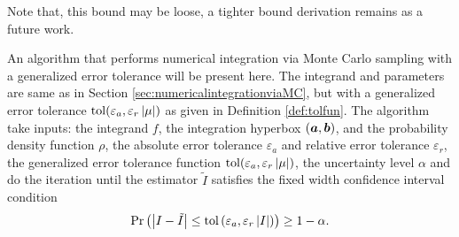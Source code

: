 \documentclass{iitthesis}
\theoremstyle{definition}
\begin{document}
Note that, this bound may be loose, a tighter bound derivation remains as a future work.


\label{sec:cubmcgalg}

An algorithm that performs numerical integration via Monte Carlo sampling with a generalized error tolerance will be present here. The integrand and parameters are same as in Section \ref{sec:numericalintegrationviaMC}, but with a generalized error tolerance $\operatorname{tol}(\varepsilon_a, \varepsilon_r\left \lvert \mu \right \rvert)$ as given in Definition \ref{def:tolfun}. The algorithm take inputs: the integrand $f$, the integration hyperbox $(\boldsymbol{a}, \boldsymbol{b})$, and the probability density function $\rho$, the absolute error tolerance $\varepsilon_a$ and relative error tolerance $\varepsilon_r$, the generalized error tolerance function $\operatorname{tol}(\varepsilon_a,\varepsilon_r\left \lvert \mu \right \rvert)$, the uncertainty level $\alpha$ and do the iteration until the estimator $\tilde{I}$ satisfies the fixed width confidence interval condition
\begin{align}\label{cubMCgCI}
\Pr \left(\left \lvert I-\tilde{I} \right \rvert \leq \operatorname{tol}\left(\varepsilon_a, \varepsilon_r\left \lvert I \right \rvert\right)\right) \geq 1-\alpha.
\end{align}
\end{document}
